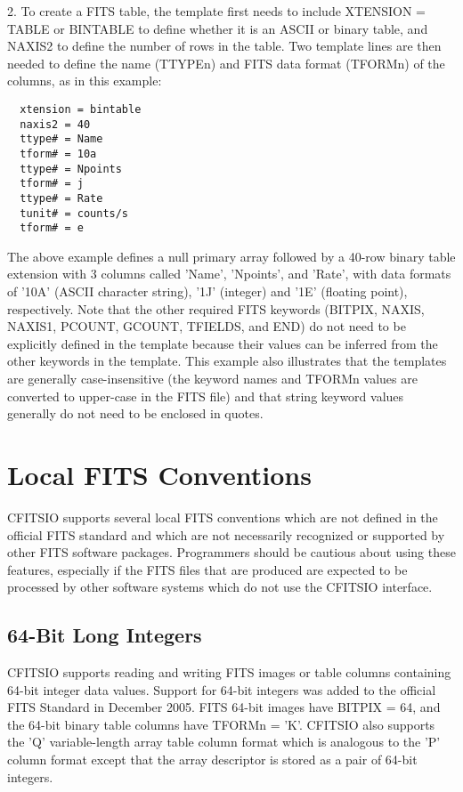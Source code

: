 \documentclass[11pt]{book}
\begin{document}
2.  To create a FITS  table, the template first needs to include
XTENSION = TABLE or BINTABLE to define whether it is an ASCII or binary
table, and NAXIS2 to define the number of rows in the table.  Two
template lines are then needed to define the name (TTYPEn) and FITS data
format (TFORMn) of the columns, as in this example:

\begin{verbatim}
  xtension = bintable
  naxis2 = 40
  ttype# = Name
  tform# = 10a
  ttype# = Npoints
  tform# = j
  ttype# = Rate
  tunit# = counts/s
  tform# = e
\end{verbatim}
The above example defines a null primary array followed by a 40-row
binary table extension with 3 columns called 'Name', 'Npoints', and
'Rate', with data formats of '10A' (ASCII character string), '1J'
(integer) and '1E' (floating point), respectively.  Note that the other
required FITS keywords (BITPIX, NAXIS, NAXIS1, PCOUNT, GCOUNT, TFIELDS,
and END) do not need to be explicitly defined in the template because
their values can be inferred from the other keywords in the template.
This example also illustrates that the templates are generally
case-insensitive (the keyword names and TFORMn values are converted to
upper-case in the FITS file) and that string keyword values generally
do not need to be enclosed in quotes.

\chapter{  Local FITS Conventions }

CFITSIO supports several local FITS conventions which are not
defined in the official FITS standard and which are not
necessarily recognized or supported by other FITS software packages.
Programmers should be cautious about using these features, especially
if the FITS files that are produced are expected to be processed by
other software systems which do not use the CFITSIO interface.


\section{64-Bit Long Integers}

CFITSIO supports reading and writing FITS images or table columns containing
64-bit integer data values. Support for 64-bit integers was added to the
official FITS Standard in December 2005.
 FITS 64-bit images have BITPIX =
64, and the 64-bit binary table columns have TFORMn = 'K'.  CFITSIO also
supports the 'Q' variable-length array table column format which is
analogous to the 'P' column format except that the array descriptor
is stored as a pair of 64-bit integers.
\end{document}
